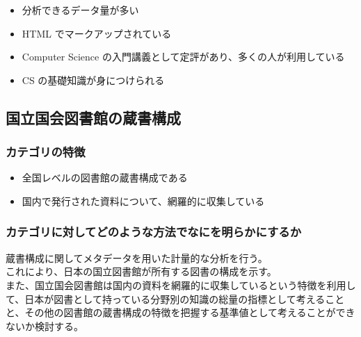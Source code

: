 \begin{itemize}
\tightlist
\item
  分析できるデータ量が多い
\item
  HTML でマークアップされている
\item
  Computer Science の入門講義として定評があり、多くの人が利用している
\item
  CS の基礎知識が身につけられる
\end{itemize}

\hypertarget{ux56fdux7acbux56fdux4f1aux56f3ux66f8ux9928ux306eux8535ux66f8ux69cbux6210}{%
\subsection{国立国会図書館の蔵書構成}\label{ux56fdux7acbux56fdux4f1aux56f3ux66f8ux9928ux306eux8535ux66f8ux69cbux6210}}

\hypertarget{ux30abux30c6ux30b4ux30eaux306eux7279ux5fb4-3}{%
\subsubsection{カテゴリの特徴}\label{ux30abux30c6ux30b4ux30eaux306eux7279ux5fb4-3}}

\begin{itemize}
\tightlist
\item
  全国レベルの図書館の蔵書構成である
\item
  国内で発行された資料について、網羅的に収集している
\end{itemize}

\hypertarget{ux30abux30c6ux30b4ux30eaux306bux5bfeux3057ux3066ux3069ux306eux3088ux3046ux306aux65b9ux6cd5ux3067ux306aux306bux3092ux660eux3089ux304bux306bux3059ux308bux304b-3}{%
\subsubsection{カテゴリに対してどのような方法でなにを明らかにするか}\label{ux30abux30c6ux30b4ux30eaux306bux5bfeux3057ux3066ux3069ux306eux3088ux3046ux306aux65b9ux6cd5ux3067ux306aux306bux3092ux660eux3089ux304bux306bux3059ux308bux304b-3}}

蔵書構成に関してメタデータを用いた計量的な分析を行う。\\
これにより、日本の国立図書館が所有する図書の構成を示す。\\
また、国立国会図書館は国内の資料を網羅的に収集しているという特徴を利用して、日本が図書として持っている分野別の知識の総量の指標として考えることと、その他の図書館の蔵書構成の特徴を把握する基準値として考えることができないか検討する。


